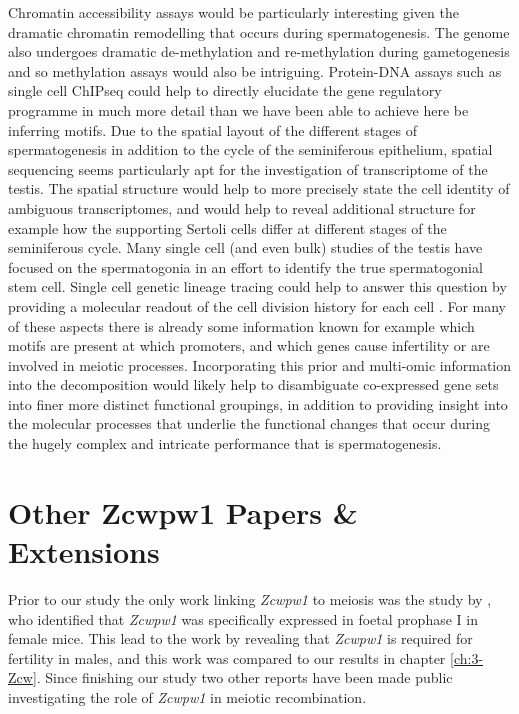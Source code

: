 Chromatin accessibility assays would be particularly interesting given the dramatic chromatin remodelling that occurs during spermatogenesis. The genome also undergoes dramatic de-methylation and re-methylation during gametogenesis and so methylation assays would also be intriguing. Protein-DNA assays such as single cell ChIPseq could help to directly elucidate the gene regulatory programme in much more detail than we have been able to achieve here be inferring motifs. Due to the spatial layout of the different stages of spermatogenesis in addition to the cycle of the seminiferous epithelium, spatial sequencing seems particularly apt for the investigation of transcriptome of the testis. The spatial structure would help to more precisely state the cell identity of ambiguous transcriptomes, and would help to reveal additional structure for example how the supporting Sertoli cells differ at different stages of the seminiferous cycle. Many single cell (and even bulk) studies of the testis have focused on the spermatogonia in an effort to identify the true spermatogonial stem cell. Single cell genetic lineage tracing could help to answer this question by providing a molecular readout of the cell division history for each cell \parencite[reviewed in][]{Baron2019Unravelling, McKenna2019Recording}. For many of these aspects there is already some information known for example which motifs are present at which promoters, and which genes cause infertility or are involved in meiotic processes. Incorporating this prior and multi-omic information into the decomposition would likely help to disambiguate co-expressed gene sets into finer more distinct functional groupings, in addition to providing insight into the molecular processes that underlie the functional changes that occur during the hugely complex and intricate performance that is spermatogenesis.

\section{Other Zcwpw1 Papers \& Extensions}

Prior to our study the only work linking \textit{Zcwpw1} to meiosis was the study by \cite{Soh2015Gene}, who identified that \textit{Zcwpw1} was specifically expressed in foetal prophase I in female mice. This lead to the work by \cite{Li2019histone} revealing that \textit{Zcwpw1} is required for fertility in males, and this work was compared to our results in chapter \ref{ch:3-Zcw}. Since finishing our study two other reports have been made public investigating the role of \textit{Zcwpw1} in meiotic recombination.

